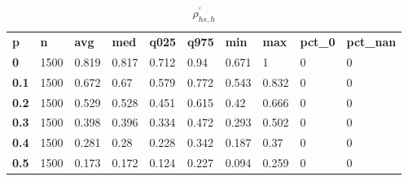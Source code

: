 \begin{table}[h]
 \centering 
\footnotesize
\caption{$\rho_{hs,h}^\prime $}
\label{tab:alphahsh}
\begin{tabular}[h]{| l l l l l l l l l l|
    } \hline
\textbf{ p} & \textbf{ n} & \textbf{ avg} & \textbf{ med} & \textbf{ q025} & \textbf{ q975} & \textbf{ min} & \textbf{ max} & \textbf{ pct\_0} & \textbf{ pct\_nan}
           \\
  \textbf{  0} & 1500 & 0.819 & 0.817 & 0.712 &  0.94 & 0.671 &     1 & 0 & 0
           \\
  \textbf{0.1} & 1500 & 0.672 &  0.67 & 0.579 & 0.772 & 0.543 & 0.832 & 0 & 0
           \\
  \textbf{0.2} & 1500 & 0.529 & 0.528 & 0.451 & 0.615 &  0.42 & 0.666 & 0 & 0
           \\
  \textbf{0.3} & 1500 & 0.398 & 0.396 & 0.334 & 0.472 & 0.293 & 0.502 & 0 & 0
           \\
  \textbf{0.4} & 1500 & 0.281 &  0.28 & 0.228 & 0.342 & 0.187 &  0.37 & 0 & 0
           \\
  \textbf{0.5} & 1500 & 0.173 & 0.172 & 0.124 & 0.227 & 0.094 & 0.259 & 0 & 0
           \\
 \hline \end{tabular}
 \end{table}
